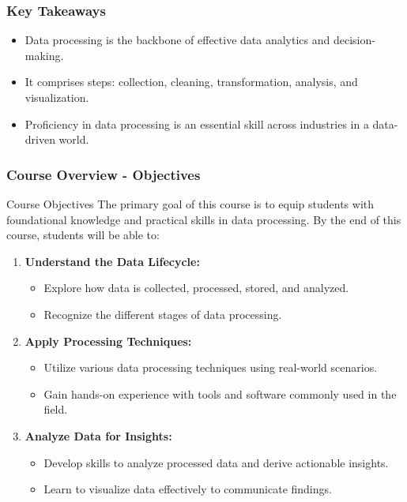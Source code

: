 \documentclass[aspectratio=169]{beamer}
\begin{document}
\begin{frame}[fragile]
  \frametitle{Key Takeaways}
  \begin{itemize}
    \item Data processing is the backbone of effective data analytics and decision-making.
    \item It comprises steps: collection, cleaning, transformation, analysis, and visualization.
    \item Proficiency in data processing is an essential skill across industries in a data-driven world.
  \end{itemize}
\end{frame}

\begin{frame}[fragile]
    \frametitle{Course Overview - Objectives}
    \begin{block}{Course Objectives}
        The primary goal of this course is to equip students with foundational knowledge and practical skills in data processing. By the end of this course, students will be able to:
    \end{block}

    \begin{enumerate}
        \item \textbf{Understand the Data Lifecycle:}
            \begin{itemize}
                \item Explore how data is collected, processed, stored, and analyzed.
                \item Recognize the different stages of data processing.
            \end{itemize}
        
        \item \textbf{Apply Processing Techniques:}
            \begin{itemize}
                \item Utilize various data processing techniques using real-world scenarios.
                \item Gain hands-on experience with tools and software commonly used in the field.
            \end{itemize}

        \item \textbf{Analyze Data for Insights:}
            \begin{itemize}
                \item Develop skills to analyze processed data and derive actionable insights.
                \item Learn to visualize data effectively to communicate findings.
            \end{itemize}
    \end{enumerate}
\end{frame}
\end{document}
